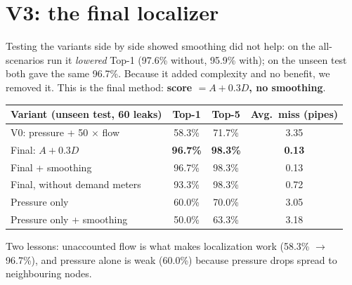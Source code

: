 \documentclass[11pt,a4paper]{article}
\begin{document}
\section{V3: the final localizer}
Testing the variants side by side showed smoothing did not help: on the all-scenarios run it \emph{lowered} Top-1 (97.6\% without, 95.9\% with); on the unseen test both gave the same 96.7\%. Because it added complexity and no benefit, we removed it. This is the final method: \textbf{score $=A+0.3D$, no smoothing}.
\begin{center}\small\begin{tabular}{@{}lccc@{}}\toprule
Variant (unseen test, 60 leaks) & Top-1 & Top-5 & Avg.\ miss (pipes) \\\midrule
V0: pressure + 50 $\times$ flow & 58.3\% & 71.7\% & 3.35 \\
Final: $A+0.3D$ & \textbf{96.7\%} & \textbf{98.3\%} & \textbf{0.13} \\
Final + smoothing & 96.7\% & 98.3\% & 0.13 \\
Final, without demand meters & 93.3\% & 98.3\% & 0.72 \\
Pressure only & 60.0\% & 70.0\% & 3.05 \\
Pressure only + smoothing & 50.0\% & 63.3\% & 3.18 \\\bottomrule\end{tabular}\end{center}
Two lessons: unaccounted flow is what makes localization work (58.3\% $\to$ 96.7\%), and pressure alone is weak (60.0\%) because pressure drops spread to neighbouring nodes.
\end{document}
